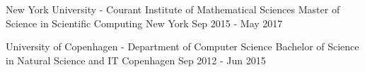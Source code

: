 

\begin{cventries}

  \cventryedu
    {New York University - Courant Institute of Mathematical Sciences} %
    {Master of Science in Scientific Computing} %
    {New York} %
    {Sep 2015 - May 2017}

  \cventryedu
    {University of Copenhagen - Department of Computer Science} %
    {Bachelor of Science in Natural Science and IT} %
    {Copenhagen} %
    {Sep 2012 - Jun 2015}

\end{cventries}
